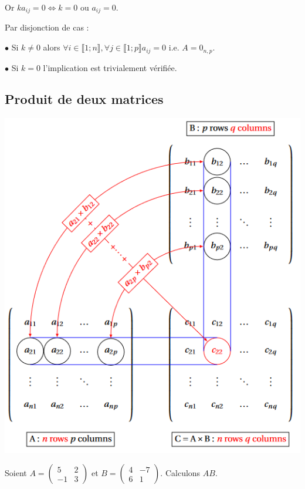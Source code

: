 \documentclass[10pt,a4paper]{article}
\begin{document}
Or $ka_{ij}=0 \iff k=0$ ou $a_{ij}=0$.

Par disjonction de cas :

$\bullet$ Si $k \neq 0$ alors $\forall i \in \llbracket 1;n \rrbracket, \forall j \in \llbracket 1;p \rrbracket a_{ij}=0$ i.e. $A=0_{n,p}$.

$\bullet$ Si $k=0$ l'implication est trivialement vérifiée.


\subsection{Produit de deux matrices}


\begin{center}
\includegraphics[width = 0.4 \linewidth]{prod_mat}
\end{center}

\exe Soient $A=\begin{pmatrix}   5&2\\-1&3   \end{pmatrix}$ et $B=\begin{pmatrix}   4&-7\\6&1  \end{pmatrix}$. Calculons $AB$. 
\end{document}

